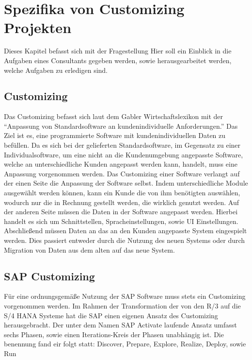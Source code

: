 \chapter{Spezifika von Customizing Projekten}
\label{chap:SpecCustom}

	Dieses Kapitel befasst sich mit der Fragestellung \dritteUnterfrage Hier soll ein Einblick in die Aufgaben eines Consultants gegeben werden, sowie herausgearbeitet werden, welche Aufgaben zu erledigen sind.  
	
\section{Customizing}

	Das Customizing befasst sich laut dem Gabler Wirtschaftslexikon mit der \enquote{Anpassung von Standardsoftware an kundenindividuelle Anforderungen.}\autocite{Lackes_customizing}
	Das Ziel ist es, eine programmierte Software mit kundenindividuellen Daten zu befüllen. Da es sich bei der gelieferten Standardsoftware, im Gegensatz zu einer Individualsoftware, um eine nicht an die Kundenumgebung angepasste Software, welche an unterschiedliche Kunden angepasst werden kann, handelt, muss eine Anpassung vorgenommen werden. 
	Das Customizing einer Software verlangt auf der einen Seite die Anpassung der Software selbst. Indem unterschiedliche Module ausgewählt werden können, kann ein Kunde die von ihm benötigten auswählen, wodurch nur die in Rechnung gestellt werden, die wirklich genutzt werden. Auf der anderen Seite müssen die Daten in der Software angepasst werden. Hierbei handelt es sich um Schnittstellen, Spracheinstellungen, sowie \ac{UI} Einstellungen. Abschließend müssen Daten an das an den Kunden angepasste System eingespielt werden. Dies passiert entweder durch die Nutzung des neuen Systems oder durch Migration von Daten aus dem alten auf das neue System. \autocite[668-669]{Hansen2009} 
	
\section{SAP Customizing}
\label{sec:sapCustomizing}
	
	Für eine ordnungsgemäße Nutzung der SAP Software muss stets ein Customizing vorgenommen werden. Im Rahmen der Transformation der von den R/3 auf die S/4 HANA Systeme hat die SAP einen eigenen Ansatz des Customizing herausgebracht. Der unter dem Namen SAP Activate laufende Ansatz umfasst sechs Phasen, sowie einen Iterations-Kreis der Phasen unabhängig ist. Die benennung fand eir folgt statt: Discover, Prepare, Explore, Realize, Deploy, sowie Run\autocite[331]{Denecken2020}

